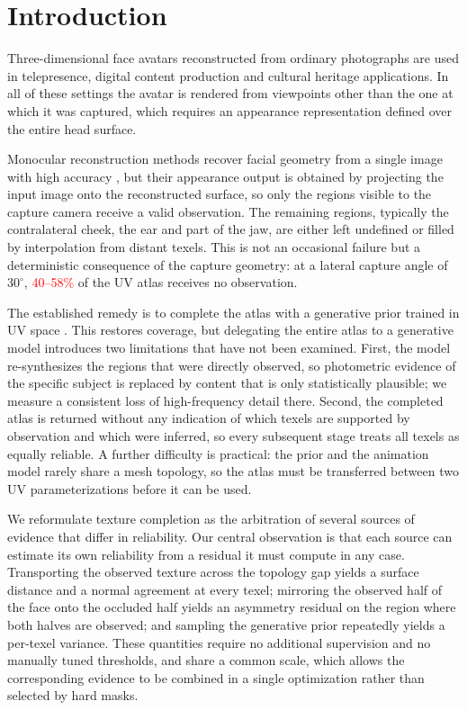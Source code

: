 \documentclass[runningheads]{llncs}
\newcommand{\PH}[1]{\textcolor{red}{#1}}
\begin{document}
\section{Introduction}

Three-dimensional face avatars reconstructed from ordinary photographs are used
in telepresence, digital content production and cultural heritage
applications. In all of these settings the avatar is rendered from viewpoints
other than the one at which it was captured, which requires an appearance
representation defined over the entire head surface.

Monocular reconstruction methods recover facial geometry from a single image
with high accuracy \cite{paysan2009bfm,feng2021deca}, but their appearance
output is obtained by projecting the input image onto the reconstructed
surface, so only the regions visible to the capture camera receive a valid
observation. The remaining regions, typically the contralateral cheek, the ear
and part of the jaw, are either left undefined or filled by interpolation from
distant texels. This is not an occasional failure but a deterministic
consequence of the capture geometry: at a lateral capture angle of
$30^{\circ}$, \PH{40--58\%} of the UV atlas receives no observation.

The established remedy is to complete the atlas with a generative prior trained
in UV space \cite{rombach2022ldm,li2024uvidm}. This restores coverage, but
delegating the entire atlas to a generative model introduces two limitations
that have not been examined. First, the model re-synthesizes the regions that
were directly observed, so photometric evidence of the specific subject is
replaced by content that is only statistically plausible; we measure a
consistent loss of high-frequency detail there. Second, the completed atlas is
returned without any indication of which texels are supported by observation
and which were inferred, so every subsequent stage treats all texels as equally
reliable. A further difficulty is practical: the prior and the animation model
rarely share a mesh topology, so the atlas must be transferred between two UV
parameterizations before it can be used.

We reformulate texture completion as the arbitration of several sources of
evidence that differ in reliability. Our central observation is that each
source can estimate its own reliability from a residual it must compute in any
case. Transporting the observed texture across the topology gap yields a
surface distance and a normal agreement at every texel; mirroring the observed
half of the face onto the occluded half yields an asymmetry residual on the
region where both halves are observed; and sampling the generative prior
repeatedly yields a per-texel variance. These quantities require no additional
supervision and no manually tuned thresholds, and share a common scale, which
allows the corresponding evidence to be combined in a single optimization
rather than selected by hard masks.
\end{document}
